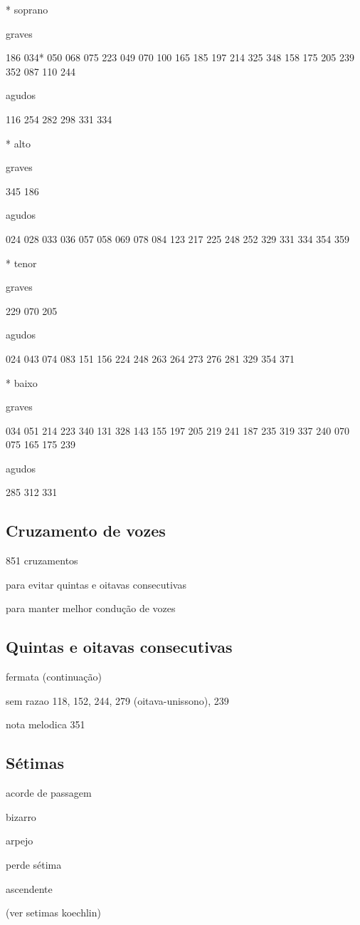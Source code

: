 \documentclass{article}
\begin{document}
* soprano

graves

186 034* 050 068 075 223 049 070 100 165 185 197 214 325 348 158 175
205 239 352 087 110 244

agudos

116 254 282 298 331 334

* alto

graves

345 186

agudos

024 028 033 036 057 058 069 078 084 123 217 225 248 252 329 331 334
354 359

* tenor

graves

229 070 205

agudos

024 043 074 083 151 156 224 248 263 264 273 276 281 329 354 371

* baixo

graves

034 051 214 223 340 131 328 143 155 197 205 219 241 187 235 319 337
240 070 075 165 175 239

agudos

285 312 331

\subsection{Cruzamento de vozes}
\label{sec:cruzamento-de-vozes}

851 cruzamentos 

para evitar quintas e oitavas consecutivas

para manter melhor condução de vozes

\subsection{Quintas e oitavas consecutivas}
\label{sec:quintas-e-oitavas}

fermata (continuação)

sem razao 118, 152, 244, 279 (oitava-unissono), 239

nota melodica 351

\subsection{Sétimas}
\label{sec:setimas}

acorde de passagem

bizarro

arpejo

perde sétima

ascendente

(ver setimas koechlin)

\renewcommand{\refname}{Referências Bibliográficas}


\end{document}
